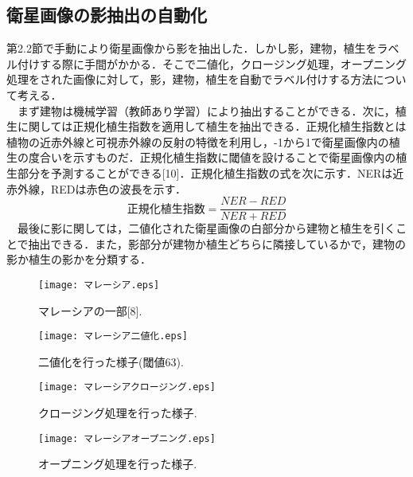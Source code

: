 \documentclass[a4j,twoside,twocolumn]{jarticle}
\begin{document}
\subsection{衛星画像の影抽出の自動化}
第2.2節で手動により衛星画像から影を抽出した．しかし影，建物，植生をラベル付けする際に手間がかかる．そこで二値化，クロージング処理，オープニング処理をされた画像に対して，影，建物，植生を自動でラベル付けする方法について考える．\\
　まず建物は機械学習（教師あり学習）により抽出することができる．次に，植生に関しては正規化植生指数を適用して植生を抽出できる．正規化植生指数とは植物の近赤外線と可視赤外線の反射の特徴を利用し，-1から1で衛星画像内の植生の度合いを示すものだ．正規化植生指数に閾値を設けることで衛星画像内の植生部分を予測することができる[10]．正規化植生指数の式を次に示す．NERは近赤外線，REDは赤色の波長を示す．\\
\begin{equation}
正規化植生指数 = \frac{NER - RED}{NER + RED}
\end{equation} 
　最後に影に関しては，二値化された衛星画像の白部分から建物と植生を引くことで抽出できる．また，影部分が建物か植生どちらに隣接しているかで，建物の影か植生の影かを分類する．\\


\begin{figure}[t]
  \begin{center}
    \texttt{[image: マレーシア.eps]}
    \caption{マレーシアの一部[8].}
    \label{fig3}
  \end{center}
\end{figure}


\begin{figure}[t]
  \begin{center}
    \texttt{[image: マレーシア二値化.eps]}
    \caption{二値化を行った様子(閾値63).}
    \label{fig4}
  \end{center}
\end{figure}

\begin{figure}[t]
  \begin{center}
    \texttt{[image: マレーシアクロージング.eps]}
    \caption{クロージング処理を行った様子.}
    \label{fig5}
  \end{center}
\end{figure}

\begin{figure}[t]
  \begin{center}
    \texttt{[image: マレーシアオープニング.eps]}
    \caption{オープニング処理を行った様子.}
    \label{fig6}
  \end{center}
\end{figure}
\end{document}
